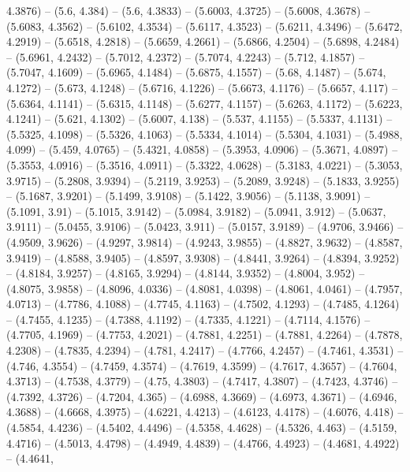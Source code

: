 {  4.3876) -- (5.6, 4.384) -- (5.6, 4.3833) -- (5.6003, 4.3725) -- (5.6008, 
  4.3678) -- (5.6083, 4.3562) -- (5.6102, 4.3534) -- (5.6117, 4.3523) -- 
  (5.6211, 4.3496) -- (5.6472, 4.2919) -- (5.6518, 4.2818) -- (5.6659, 4.2661) 
  -- (5.6866, 4.2504) -- (5.6898, 4.2484) -- (5.6961, 4.2432) -- (5.7012, 
  4.2372) -- (5.7074, 4.2243) -- (5.712, 4.1857) -- (5.7047, 4.1609) -- (5.6965,
   4.1484) -- (5.6875, 4.1557) -- (5.68, 4.1487) -- (5.674, 4.1272) -- (5.673, 
  4.1248) -- (5.6716, 4.1226) -- (5.6673, 4.1176) -- (5.6657, 4.117) -- (5.6364,
   4.1141) -- (5.6315, 4.1148) -- (5.6277, 4.1157) -- (5.6263, 4.1172) -- 
  (5.6223, 4.1241) -- (5.621, 4.1302) -- (5.6007, 4.138) -- (5.537, 4.1155) -- 
  (5.5337, 4.1131) -- (5.5325, 4.1098) -- (5.5326, 4.1063) -- (5.5334, 4.1014) 
  -- (5.5304, 4.1031) -- (5.4988, 4.099) -- (5.459, 4.0765) -- (5.4321, 4.0858) 
  -- (5.3953, 4.0906) -- (5.3671, 4.0897) -- (5.3553, 4.0916) -- (5.3516, 
  4.0911) -- (5.3322, 4.0628) -- (5.3183, 4.0221) -- (5.3053, 3.9715) -- 
  (5.2808, 3.9394) -- (5.2119, 3.9253) -- (5.2089, 3.9248) -- (5.1833, 3.9255) 
  -- (5.1687, 3.9201) -- (5.1499, 3.9108) -- (5.1422, 3.9056) -- (5.1138, 
  3.9091) -- (5.1091, 3.91) -- (5.1015, 3.9142) -- (5.0984, 3.9182) -- (5.0941, 
  3.912) -- (5.0637, 3.9111) -- (5.0455, 3.9106) -- (5.0423, 3.911) -- (5.0157, 
  3.9189) -- (4.9706, 3.9466) -- (4.9509, 3.9626) -- (4.9297, 3.9814) -- 
  (4.9243, 3.9855) -- (4.8827, 3.9632) -- (4.8587, 3.9419) -- (4.8588, 3.9405) 
  -- (4.8597, 3.9308) -- (4.8441, 3.9264) -- (4.8394, 3.9252) -- (4.8184, 
  3.9257) -- (4.8165, 3.9294) -- (4.8144, 3.9352) -- (4.8004, 3.952) -- (4.8075,
   3.9858) -- (4.8096, 4.0336) -- (4.8081, 4.0398) -- (4.8061, 4.0461) -- 
  (4.7957, 4.0713) -- (4.7786, 4.1088) -- (4.7745, 4.1163) -- (4.7502, 4.1293) 
  -- (4.7485, 4.1264) -- (4.7455, 4.1235) -- (4.7388, 4.1192) -- (4.7335, 
  4.1221) -- (4.7114, 4.1576) -- (4.7705, 4.1969) -- (4.7753, 4.2021) -- 
  (4.7881, 4.2251) -- (4.7881, 4.2264) -- (4.7878, 4.2308) -- (4.7835, 4.2394) 
  -- (4.781, 4.2417) -- (4.7766, 4.2457) -- (4.7461, 4.3531) -- (4.746, 4.3554) 
  -- (4.7459, 4.3574) -- (4.7619, 4.3599) -- (4.7617, 4.3657) -- (4.7604, 
  4.3713) -- (4.7538, 4.3779) -- (4.75, 4.3803) -- (4.7417, 4.3807) -- (4.7423, 
  4.3746) -- (4.7392, 4.3726) -- (4.7204, 4.365) -- (4.6988, 4.3669) -- (4.6973,
   4.3671) -- (4.6946, 4.3688) -- (4.6668, 4.3975) -- (4.6221, 4.4213) -- 
  (4.6123, 4.4178) -- (4.6076, 4.418) -- (4.5854, 4.4236) -- (4.5402, 4.4496) --
   (4.5358, 4.4628) -- (4.5326, 4.463) -- (4.5159, 4.4716) -- (4.5013, 4.4798) 
  -- (4.4949, 4.4839) -- (4.4766, 4.4923) -- (4.4681, 4.4922) -- (4.4641, 
}
